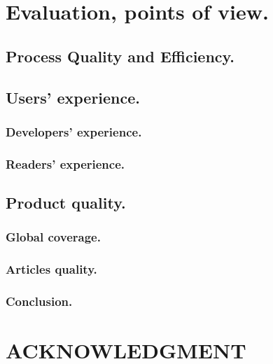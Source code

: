 \documentclass{informs3}
\begin{document}
\section{Evaluation, points of view.}
\label{sec:Evaluation}


\subsection{Process Quality and Efficiency.}
\label{subsec:processquality}


\subsection{Users' experience.}
\label{subsec:usersexperience}


\subsubsection{Developers' experience.}


\subsubsection{Readers' experience.}


\subsection{Product quality.}
\label{subsec:productquality}


\subsubsection{Global coverage.}


\subsubsection{Articles quality.}


\subsubsection{Conclusion.}



\section*{ACKNOWLEDGMENT}%



\end{document}
